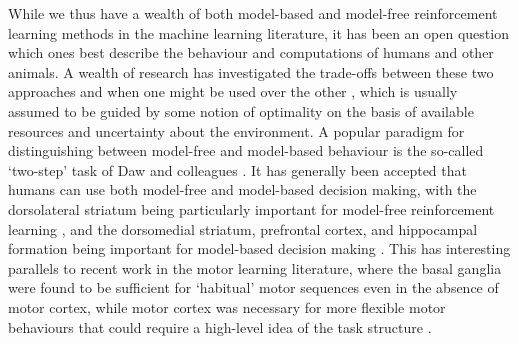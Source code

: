 While we thus have a wealth of both model-based and model-free reinforcement learning methods in the machine learning literature, it has been an open question which ones best describe the behaviour and computations of humans and other animals.
A wealth of research has investigated the trade-offs between these two approaches and when one might be used over the other \citep{daw2005uncertainty, geerts2020general, lengyel2007hippocampal}, which is usually assumed to be guided by some notion of optimality on the basis of available resources and uncertainty about the environment.
A popular paradigm for distinguishing between model-free and model-based behaviour is the so-called `two-step' task of Daw and colleagues \citep{daw2011model}.
It has generally been accepted that humans can use both model-free and model-based decision making, with the dorsolateral striatum being particularly important for model-free reinforcement learning \citep{yin2004lesions, yin2005role}, and the dorsomedial striatum, prefrontal cortex, and hippocampal formation being important for model-based decision making \citep{vikbladh2019hippocampal,geerts2020general,miller2017dorsal,niv2009reinforcement,killcross2003coordination}.
This has interesting parallels to recent work in the motor learning literature, where the basal ganglia were found to be sufficient for `habitual' motor sequences even in the absence of motor cortex, while motor cortex was necessary for more flexible motor behaviours that could require a high-level idea of the task structure \citep{mizes2023motor}.


